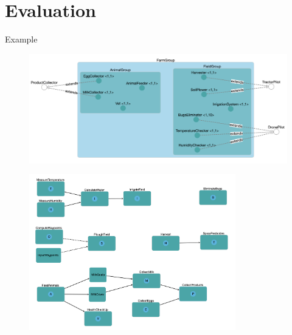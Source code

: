 \section{Evaluation}

\begin{frame}[allowframebreaks]{Example}
    \begin{figure}
        \includegraphics[width=\textwidth]{images/solution-structural.png}
    \end{figure}

    \framebreak

    \begin{figure}
        \includegraphics[width=0.8\textwidth]{images/solution-functional.png}
    \end{figure}
\end{frame}

